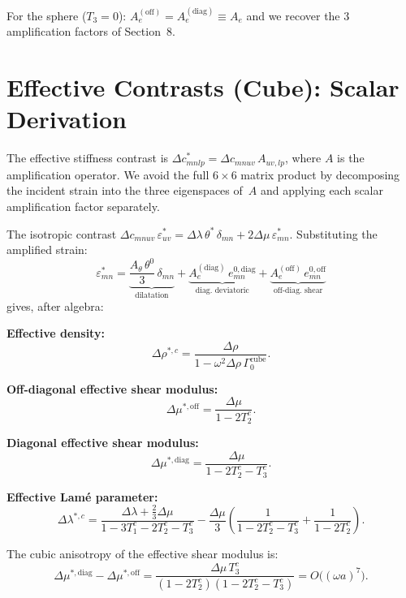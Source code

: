 For the sphere ($T_3=0$): $A_e^{(\text{off})} = A_e^{(\text{diag})} \equiv
A_e$ and we recover the 3 amplification factors of Section~8.


\section{Effective Contrasts (Cube): Scalar Derivation}

The effective stiffness contrast is
$\Delta c^*_{mnlp} = \Delta c_{mnuv}\,A_{uv,lp}$, where $A$ is the
amplification operator.  We avoid the full $6\times 6$ matrix product by
decomposing the incident strain into the three eigenspaces of~$A$ and
applying each scalar amplification factor separately.

The isotropic contrast $\Delta c_{mnuv}\,\varepsilon_{uv}^*
= \Delta\lambda\,\theta^*\,\delta_{mn} + 2\Delta\mu\,\varepsilon_{mn}^*$.
Substituting the amplified strain:
\begin{equation}
  \varepsilon_{mn}^*
  = \underbrace{\frac{A_\theta\,\theta^0}{3}\,\delta_{mn}}_{\text{dilatation}}
  + \underbrace{A_e^{(\text{diag})}\,e_{mn}^{0,\text{diag}}}_{\text{diag.\ deviatoric}}
  + \underbrace{A_e^{(\text{off})}\,e_{mn}^{0,\text{off}}}_{\text{off-diag.\ shear}}
\label{eq:ampstrain}
\end{equation}
gives, after algebra:

\medskip
\noindent\textbf{Effective density:}
\begin{equation}
  \Delta\rho^{*,c} = \frac{\Delta\rho}
  {1-\omega^2\Delta\rho\,\Gamma_0^{\text{cube}}}.
\label{eq:Drhostar_c}
\end{equation}

\noindent\textbf{Off-diagonal effective shear modulus:}
\begin{equation}
  \Delta\mu^{*,\text{off}} = \frac{\Delta\mu}{1-2T_2^c}.
\label{eq:Dmuoff}
\end{equation}

\noindent\textbf{Diagonal effective shear modulus:}
\begin{equation}
  \Delta\mu^{*,\text{diag}} = \frac{\Delta\mu}{1-2T_2^c-T_3^c}.
\label{eq:Dmudiag}
\end{equation}

\noindent\textbf{Effective Lam\'e parameter:}
\begin{equation}
  \Delta\lambda^{*,c}
  = \frac{\Delta\lambda + \tfrac{2}{3}\Delta\mu}
         {1-3T_1^c-2T_2^c-T_3^c}
  - \frac{\Delta\mu}{3}
    \left(\frac{1}{1-2T_2^c-T_3^c} + \frac{1}{1-2T_2^c}\right).
\label{eq:Dlamstar_c}
\end{equation}

The cubic anisotropy of the effective shear modulus is:
\begin{equation}
  \Delta\mu^{*,\text{diag}} - \Delta\mu^{*,\text{off}}
  = \frac{\Delta\mu\,T_3^c}
  {(1-2T_2^c)(1-2T_2^c-T_3^c)}
  = O\bigl((\omega a)^7\bigr).
\label{eq:cubicaniso}
\end{equation}

